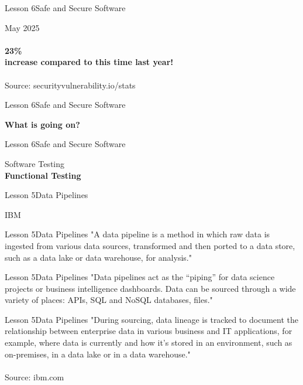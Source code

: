 \documentclass[aspectratio=1610]{beamer}
\begin{document}
\begin{frame}{Lesson 6}{Safe and Secure Software}
\Huge
\begin{center}
May 2025\\~\\
\textbf{23\%\\
 increase compared to this time last year!}\\~\\ 
\large
Source: securityvulnerability.io/stats
\end{center}
\end{frame}



\begin{frame}{Lesson 6}{Safe and Secure Software}
\Huge
\begin{center}
\textbf{What is going on?}
\end{center}
\end{frame}



\begin{frame}{Lesson 6}{Safe and Secure Software}
\Huge
\begin{center}
Software Testing\\
\textbf{Functional Testing}
\end{center}
\end{frame}





\begin{frame}{Lesson 5}{Data Pipelines}
\Huge
\begin{center}
 IBM
\end{center}
\end{frame}

\begin{frame}{Lesson 5}{Data Pipelines}
\LARGE
"A data pipeline is a method in which raw data is ingested from 
various data sources, transformed and then ported to a data store, 
such as a data lake or data warehouse, for analysis."
\end{frame}

\begin{frame}{Lesson 5}{Data Pipelines}
\LARGE
"Data pipelines act as the “piping” for data science projects or 
business intelligence dashboards. Data can be sourced through a wide 
variety of places: APIs, SQL and NoSQL databases, files."
\end{frame}

\begin{frame}{Lesson 5}{Data Pipelines}
\LARGE
"During sourcing, data lineage is tracked to document the 
relationship between enterprise data in various business and IT 
applications, for example, where data is currently and how it’s 
stored in an environment, such as on-premises, in a data lake or in a
data warehouse."\\~\\
Source: ibm.com
\end{frame}
\end{document}
